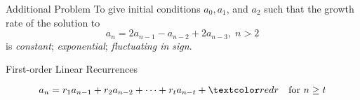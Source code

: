 % 
% 

\begin{frame}{}
  \begin{exampleblock}{Additional Problem}
    To give initial conditions $a_0, a_1$, and $a_2$ such that the growth rate of the solution to
    \[
      a_n = 2a_{n-1} - a_{n-2} + 2a_{n-3},\; n > 2
    \]
    is  {\it constant};  {\it exponential};  {\it fluctuating in sign}.
  \end{exampleblock}

  \pause
  \vspace{0.50cm}
\end{frame}

\begin{frame}{}
  \begin{center}
    {\large First-order Linear  Recurrences}
  \end{center}

  \[
    a_n = r_1 a_{n-1} + r_2 a_{n-2} + \cdots + r_t a_{n-t} + \red{r} \quad \text{for } n \ge t
  \]


\end{frame}

% 
% 
% 
% 

